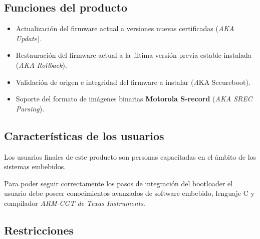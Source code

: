 \documentclass[12pt,a4paper]{article}
\begin{document}
\subsection{Funciones del producto}
\label{sec:product_functions}

\begin{itemize}
	\item Actualización del firmware actual a versiones nuevas certificadas (\textit{AKA Update}).
	\item Restauración del firmware actual a la última versión previa estable instalada (\textit{AKA Rollback}).
	\item Validación de origen e integridad del firmware a instalar (\textit AKA Secureboot).
	\item Soporte del formato de imágenes binarias \textbf{Motorola S-record} (\textit{AKA SREC Parsing}).
\end{itemize}


\subsection{Características de los usuarios}
\label{sec:user_characteristics}

Los usuarios finales de este producto son personas capacitadas en el ámbito de los sistemas embebidos.

Para poder seguir correctamente los pasos de integración del bootloader el usuario debe poseer conocimientos avanzados de software embebido, lenguaje C y compilador \textit{ARM-CGT de Texas Instruments}.


\subsection{Restricciones}
\label{sec:constraints}
\end{document}
